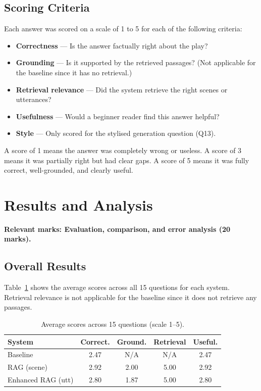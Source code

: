 \documentclass[10pt,conference]{IEEEtran}
\begin{document}
\subsection{Scoring Criteria}

Each answer was scored on a scale of 1 to 5 for each of the following
criteria:

\begin{itemize}
    \item \textbf{Correctness} --- Is the answer factually right
    about the play?
    \item \textbf{Grounding} --- Is it supported by the retrieved
    passages? (Not applicable for the baseline since it has no
    retrieval.)
    \item \textbf{Retrieval relevance} --- Did the system retrieve
    the right scenes or utterances?
    \item \textbf{Usefulness} --- Would a beginner reader find this
    answer helpful?
    \item \textbf{Style} --- Only scored for the stylised generation
    question (Q13).
\end{itemize}

A score of 1 means the answer was completely wrong or useless. A
score of 3 means it was partially right but had clear gaps. A score
of 5 means it was fully correct, well-grounded, and clearly useful.

\section{Results and Analysis}
\label{sec:results}

\textbf{Relevant marks: Evaluation, comparison, and error analysis
(20 marks).}

\subsection{Overall Results}

Table~\ref{tab:results-summary} shows the average scores across all
15 questions for each system. Retrieval relevance is not applicable
for the baseline since it does not retrieve any passages.

\begin{table}[ht]
\centering
\caption{Average scores across 15 questions (scale 1--5).}
\label{tab:results-summary}
\begin{tabular}{lcccc}
\toprule
System & Correct. & Ground. & Retrieval & Useful. \\
\midrule
Baseline          & 2.47 & N/A  & N/A  & 2.47 \\
RAG (scene)       & 2.92 & 2.00 & 5.00 & 2.92 \\
Enhanced RAG (utt)& 2.80 & 1.87 & 5.00 & 2.80 \\
\bottomrule
\end{tabular}
\end{table}
\end{document}
